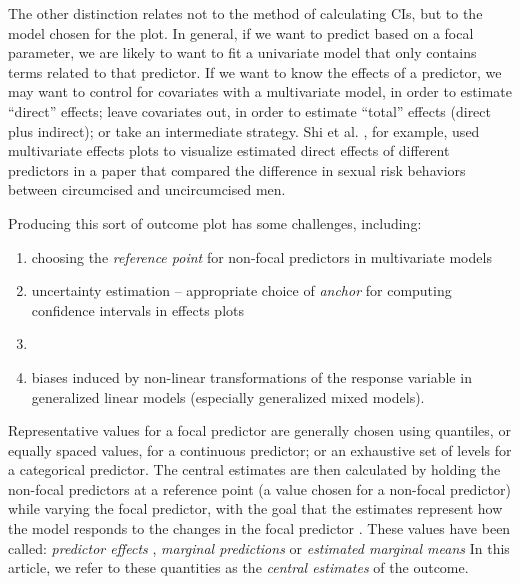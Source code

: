 The other distinction relates not to the method of calculating CIs, but to the model chosen for the plot. 
In general, if we want to predict based on a focal parameter, we are likely to want to fit a univariate model that only contains terms related to that predictor.
If we want to know the effects of a predictor, we may want to control for covariates with a multivariate model, in order to estimate “direct” effects; leave covariates out, in order to estimate “total” effects (direct plus indirect); or take an intermediate strategy.
Shi et al. \citep{shi_evidence_2017}, for example, used multivariate effects plots to visualize estimated direct effects of different predictors in a paper that compared the difference in sexual risk behaviors between circumcised and uncircumcised men.

Producing this sort of outcome plot has some challenges, including:
\begin{enumerate}
\item choosing the \emph{reference point} for non-focal predictors in multivariate models
\item uncertainty estimation -- appropriate choice of \emph{anchor} for computing confidence intervals in effects plots
\item {}  
\item biases induced by non-linear transformations of the response variable in generalized linear models (especially generalized mixed models).
\end{enumerate}

Representative values for a focal predictor are generally chosen using quantiles, or equally spaced values, for a continuous predictor; or an exhaustive set of levels for a categorical predictor.
The central estimates are then calculated by holding the non-focal predictors at a reference point (a value chosen for a non-focal predictor) while varying the focal predictor, with the goal that the estimates represent how the model responds to the changes in the focal predictor \citep{fox2009effect, hanmer2013behind}. These values have been called: \emph{predictor effects} \citep{fox2009effect}, \emph{marginal predictions} \citep{leeper2017package} or \emph{estimated marginal means} \citep{lenth2018package} In this article, we refer to these quantities as the \emph{central estimates} of the outcome. 


